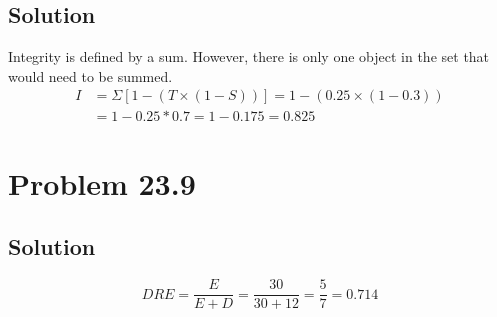 \documentclass[10pt]{article}
\begin{document}
\subsection*{Solution}
Integrity is defined by a sum.
However, there is only one object in the set that would need to be summed.
\begin{align}
    I   &=  \Sigma \left[ 1 - \left( T \times \left( 1 - S \right) \right) \right]
        =   1 - (0.25 \times (1 - 0.3))\\
        &=  1 - 0.25 * 0.7
        =   1 - 0.175
        =   \boxed{0.825}
\end{align}

\section*{Problem 23.9}

\subsection*{Solution}
\begin{equation}
    DRE =   \frac{E}{E + D}
        =   \frac{30}{30 + 12}
        =   \frac{5}{7}
        =   \boxed{0.714}
\end{equation}
\end{document}
